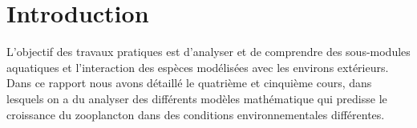 \section{Introduction}

\par{
L'objectif des travaux pratiques est d'analyser et de comprendre des sous-modules
aquatiques et l'interaction des espèces modélisées avec les environs extérieurs.
Dans ce rapport nous avons détaillé le quatrième et cinquième cours, dans lesquels
on a du analyser des différents modèles mathématique qui predisse le croissance du
zooplancton dans des conditions environnementales différentes.
}
